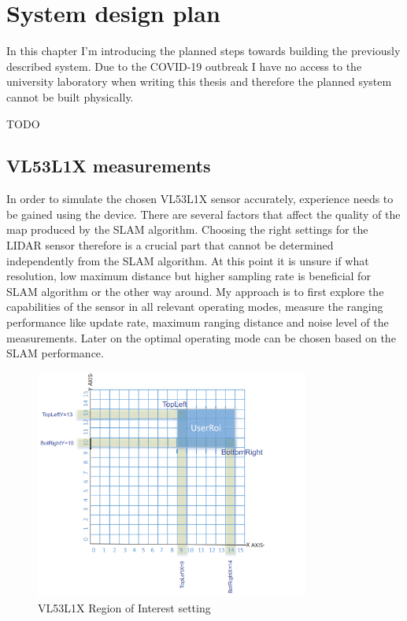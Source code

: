\chapter{System design plan} \label{chap:system_design}
In this chapter I'm introducing the planned steps towards building the previously described system. Due to the 
COVID-19 outbreak I have no access to the university laboratory when writing this thesis and therefore the planned 
system cannot be built physically. 

TODO

\section{VL53L1X measurements} \label{sect:vl53l1x_measurements}
In order to simulate the chosen VL53L1X sensor accurately, experience needs to be gained using the device. 
There are several factors that affect the quality of the map produced by the SLAM algorithm. Choosing the right
settings for the LIDAR sensor therefore is a crucial part that cannot be determined independently from the SLAM 
algorithm. At this point it is unsure if what resolution, low maximum distance but higher sampling rate is beneficial 
for SLAM algorithm or the other way around. My approach is to first explore the capabilities of the sensor in 
all relevant operating modes, measure the ranging performance like update rate, maximum ranging distance and 
noise level of the measurements. Later on the optimal operating mode can be chosen based on the SLAM performance. 

\begin{figure}[!hb]
    \centering
    \includegraphics[width=90mm, keepaspectratio]{figures/vl53l1x_roi_setup.png}
    \caption{VL53L1X Region of Interest setting \cite{VL53L1XApplicationNote}}
    \label{fig:vl53l1x_roi_setup}
\end{figure}

